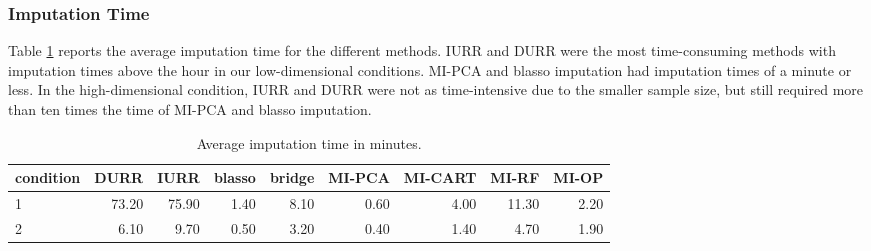 \FloatBarrier

\subsubsection{Imputation Time}

	Table \ref{tab:time} reports the average imputation time for the different methods.
	IURR and DURR were the most time-consuming methods with imputation times above the hour 
	in our low-dimensional conditions. 
	MI-PCA and blasso imputation had imputation times of a minute or less.
	In the high-dimensional condition, IURR and DURR were not as time-intensive due to the smaller
	sample size, but still required more than ten times the time of MI-PCA and blasso imputation.

\begin{table}
	\centering
	\begin{tabular}{l | r | r | r | r | r | r | r | r }
		condition & DURR & IURR & blasso & bridge & MI-PCA & MI-CART & MI-RF & MI-OP \\
		\hline
		1 & 73.20 & 75.90 & 1.40 & 8.10 & 0.60 & 4.00 & 11.30 & 2.20 \\ 
		2 & 6.10 & 9.70 & 0.50 & 3.20 & 0.40 & 1.40 & 4.70 & 1.90 	
	\end{tabular}
	\caption{\label{tab:time}Average imputation time in minutes.}
\end{table}

\FloatBarrier


